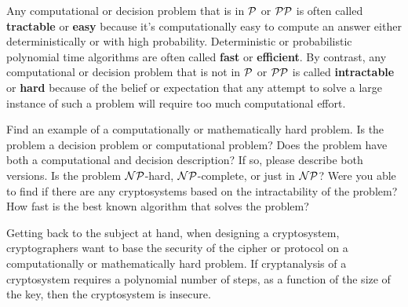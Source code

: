 Any computational or decision problem that is in $\P$ or $\PP$ is often called {\bf tractable} or {\bf easy}  because it's computationally easy to compute an answer either deterministically or with high probability. Deterministic or probabilistic polynomial time algorithms are often called {\bf fast} or {\bf efficient}. By contrast, any computational or decision problem that is not in $\P$ or $\PP$ is called {\bf intractable} or {\bf hard}  because of the belief or expectation that any attempt to solve a large instance of such a problem will require too much computational effort.

%

\begin{problem} [10 points]
Find an example of a computationally or mathematically hard problem. Is the problem a decision problem or computational problem? Does the problem have both a computational and decision description? If so, please describe both versions. Is the problem $\NP$-hard, $\NP$-complete, or just in  $\NP$? Were you able to find if there are any cryptosystems based on the intractability of the problem? How fast is the best known algorithm that solves the problem?
\end{problem}

Getting back to the subject at hand, when designing a cryptosystem, cryptographers want to base the security of the cipher or protocol on a computationally or mathematically hard problem. If cryptanalysis of a cryptosystem requires a polynomial number of steps, as a function of the size of the key, then the cryptosystem is insecure.

